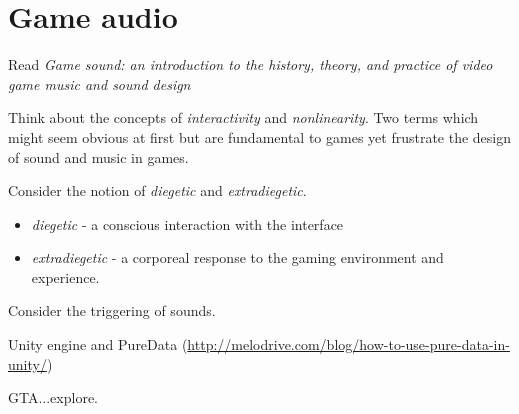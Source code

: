 
\chapter{Game audio}
\label{games}


Read \textit{Game sound: an introduction to the history, theory, and practice of video game music and sound design} \citeyearpar{collins2008game}

Think about the concepts of \textit{interactivity} and \textit{nonlinearity}. Two terms which might seem obvious at first but are fundamental to games yet frustrate the design of sound and music in games. 

Consider the notion of \textit{diegetic} and \textit{extradiegetic}. 
\begin{itemize}
\item \textit{diegetic} - a conscious interaction with the interface
\item \textit{extradiegetic} - a corporeal response to the gaming environment and experience. 
\end{itemize}

Consider the triggering of sounds. 

Unity engine and PureData (\url{http://melodrive.com/blog/how-to-use-pure-data-in-unity/})

GTA...explore.


